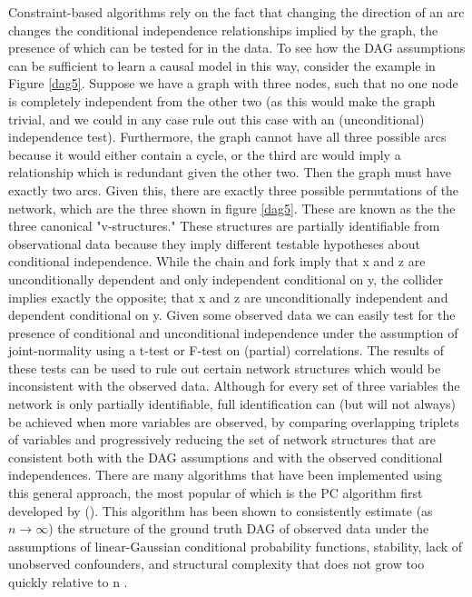 \documentclass{article}
\begin{document}
Constraint-based algorithms rely on the fact that changing the direction of an arc changes the conditional independence relationships implied by the graph, the presence of which can be tested for in the data. To see how the DAG assumptions can be sufficient to learn a causal model in this way, consider the example in Figure \ref{dag5}. Suppose we have a graph with three nodes, such that no one node is completely independent from the other two (as this would make the graph trivial, and we could in any case rule out this case with an (unconditional) independence test). Furthermore, the graph cannot have all three possible arcs because it would either contain a cycle, or the third arc would imply a relationship which is redundant given the other two. Then the graph must have exactly two arcs. Given this, there are exactly three possible permutations of the network, which are the three shown in figure \ref{dag5}. These are known as the the three canonical "v-structures." \parencite{pearl2014probabilistic} These structures are partially identifiable from observational data because they imply different testable hypotheses about conditional independence. While the chain and fork imply that x and z are unconditionally dependent and only independent conditional on y, the collider implies exactly the opposite; that x and z are unconditionally independent and dependent conditional on y. Given some observed data we can easily test for the presence of conditional and unconditional independence under the assumption of joint-normality using a t-test or F-test on (partial) correlations. The results of these tests can be used to rule out certain network structures which would be inconsistent with the observed data. Although for every set of three variables the network is only partially identifiable, full identification can (but will not always) be achieved when more variables are observed, by comparing overlapping triplets of variables and progressively reducing the set of network structures that are consistent both with the DAG assumptions and with the observed conditional independences. There are many algorithms that have been implemented using this general approach, the most popular of which is the PC algorithm first developed by \citeauthor{spirtes2000causation} (\citeyear{spirtes2000causation}). This algorithm has been shown to consistently estimate (as $n \rightarrow \infty$) the structure of the ground truth DAG of observed data under the assumptions of linear-Gaussian conditional probability functions, stability, lack of unobserved confounders, and structural complexity that does not grow too quickly relative to n \parencite{kalisch2007estimating}. 
\end{document}
